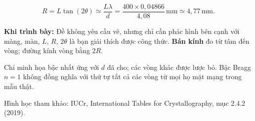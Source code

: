 \documentclass[11pt,a4paper]{article}
\begin{document}
\[
R=L\tan(2\theta)\simeq\frac{L\lambda}{d}
=\frac{400\times0{,}04866}{4{,}08}\,\mathrm{mm}
\simeq \boxed{4{,}77\,\mathrm{mm}}.
\]
\colorbox{pale}{\parbox{\dimexpr\linewidth-2\fboxsep}{\vspace{2mm}\textbf{Khi trình bày:} Đề không yêu cầu vẽ, nhưng chỉ cần phác hình bên cạnh với màng, màn, $L$, $R$, $2\theta$ là bạn giải thích được công thức. \textbf{Bán kính} đo từ tâm đến vòng; đường kính vòng bằng $2R$.\vspace{2mm}}}
\vfill
{\footnotesize\color{muted}Chỉ minh họa bậc nhất ứng với $d$ đã cho; các vòng khác được lược bỏ. Bậc Bragg $n=1$ không đồng nghĩa với thứ tự tất cả các vòng từ mọi họ mặt mạng trong mẫu thật.\par Hình học tham khảo: IUCr, International Tables for Crystallography, mục 2.4.2 (2019).}
\end{document}
